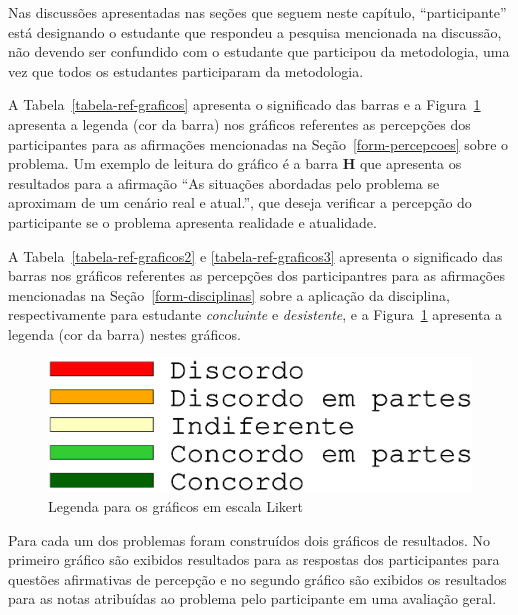 Nas discussões apresentadas nas seções que seguem neste capítulo,
``participante'' está designando o estudante que respondeu a
pesquisa mencionada na discussão, não devendo ser confundido com
o estudante que participou da metodologia, uma vez que todos
os estudantes participaram da metodologia.


A Tabela~\ref{tabela-ref-graficos} apresenta o significado das barras
e a Figura~\ref{figura-ref-graficos} apresenta a legenda (cor da barra)
nos gráficos referentes as percepções dos participantes para as
afirmações mencionadas na Seção~\ref{form-percepcoes} sobre
o problema.
Um exemplo de leitura do gráfico é a barra \textbf{H} que apresenta
os resultados para a afirmação ``As situações abordadas pelo problema
se aproximam de um cenário real e atual.'', que deseja verificar
a percepção do participante se o problema apresenta realidade
e atualidade.



A Tabela~\ref{tabela-ref-graficos2} e \ref{tabela-ref-graficos3} apresenta
o significado das barras nos gráficos referentes as percepções
dos participantres para as afirmações mencionadas
na Seção~\ref{form-disciplinas} sobre a aplicação da disciplina,
respectivamente para estudante \textit{concluinte} e \textit{desistente},
e a Figura~\ref{figura-ref-graficos} apresenta a legenda (cor da barra)
nestes gráficos.

\begin{figure}[!htb]
\centering
\includegraphics[scale=0.3,trim={0 4cm 0 1.5cm},clip]{figura-ref-graficos.eps}
\caption{Legenda para os gráficos em escala Likert} 
\label{figura-ref-graficos}
\end{figure}




Para cada um dos problemas foram construídos dois gráficos de resultados.
No primeiro gráfico são exibidos resultados para as respostas
dos participantes para questões afirmativas de percepção e
no segundo gráfico são exibidos os resultados para as notas atribuídas
ao problema pelo participante em uma avaliação geral.

